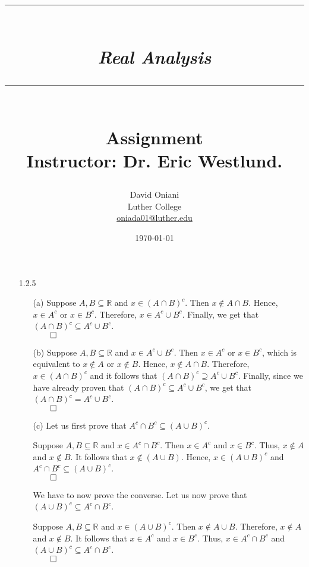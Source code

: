 \documentclass[11pt]{article}
\author{David Oniani\\
        Luther College\\
        \href{mailto:oniada01@luther.edu}{oniada01@luther.edu}}
\title{\rule{\paperwidth - 150pt}{1pt}\textbf{\\\textit{Real Analysis}\\}\rule
{\paperwidth - 150pt}{1pt}\\\textbf{Assignment \textnumero1}\\{\normalsize
Instructor: Dr. Eric Westlund.}}
\date{\today}
\newcommand{\reals}{\mathbb{R}}
\begin{document}
\maketitle

%
%
%

\begin{itemize}
    \item[1.2.5]
    \begin{itemize}
        \item[(a)]
        Suppose $A, B \subseteq \reals$ and $x \in (A \cap B)^c$. Then $x
        \notin A \cap B$. Hence, $x \in A^c$ or $x \in B^c$. Therefore, $x \in
        A^c \cup B^c$. Finally, we get that $(A \cap B)^c \subseteq A^c \cup
        B^c$.\\
        $\qed$

        \item[(b)]
        Suppose $A, B \subseteq \reals$ and $x \in A^c \cup B^c$. Then $x
        \in A^c$ or $x \in B^c$, which is equivalent to $x \notin A$ or $x
        \notin B$. Hence, $x \notin A \cap B$. Therefore, $x \in (A \cap B)^c$
        and it follows that $(A \cap B)^c \supseteq A^c \cup B^c$. Finally,
        since we have already proven that $(A \cap B)^c \subseteq A^c \cup
        B^c$, we get that $(A \cap B)^c = A^c \cup B^c$.\\
        $\qed$

        \item[(c)]
        Let us first prove that $A^c \cap B^c \subseteq (A \cup B)^c$.

        Suppose $A, B \subseteq \reals$ and $x \in A^c \cap B^c$. Then $x
        \in A^c$ and $x \in B^c$. Thus, $x \notin A$ and $x \notin B$. It
        follows that $x \notin (A \cup B)$. Hence, $x \in (A \cup B)^c$ and
        $A^c \cap B^c \subseteq (A \cup B)^c$.\\
        $\qed$

        We have to now prove the converse. Let us now prove that $(A \cup B)^c
        \subseteq A^c \cap B^c$.

        Suppose $A, B \subseteq \reals$ and $x \in (A \cup B)^c$. Then $x
        \notin A \cup B$. Therefore, $x \notin A$ and $x \notin B$. It follows
        that $x \in A^c$ and $x \in B^c$. Thus, $x \in A^c \cap B^c$ and $(A
        \cup B)^c \subseteq A^c \cap B^c$.\\
        $\qed$


\end{itemize}
\end{itemize}
\end{document}
